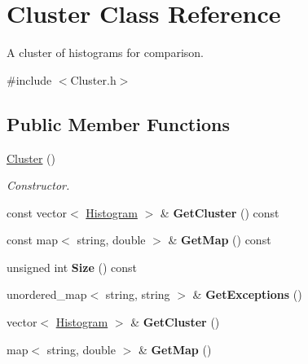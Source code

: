 \hypertarget{classCluster}{}\section{Cluster Class Reference}
\label{classCluster}


A cluster of histograms for comparison.  




{\ttfamily \#include $<$Cluster.\+h$>$}

\subsection*{Public Member Functions}
\begin{DoxyCompactItemize}
\item 
\mbox{\label{classCluster_aee7feb1d599d4c8fda6c3ee83e86ba81}} 
\hyperlink{classCluster_aee7feb1d599d4c8fda6c3ee83e86ba81}{Cluster} ()
\begin{DoxyCompactList}\small\item\em Constructor. \end{DoxyCompactList}\item 
\mbox{\label{classCluster_aa890420aa5906859751f7920dc5b30d0}} 
const vector$<$ \hyperlink{classHistogram}{Histogram} $>$ \& {\bfseries Get\+Cluster} () const
\item 
\mbox{\label{classCluster_a4e3685824bdd4b01763f8e811000f275}} 
const map$<$ string, double $>$ \& {\bfseries Get\+Map} () const
\item 
\mbox{\label{classCluster_a916e731be9d3e52a404152e94b8b127d}} 
unsigned int {\bfseries Size} () const
\item 
\mbox{\label{classCluster_ae703b09c81c25ab89bde18ca09aa1a5d}} 
unordered\+\_\+map$<$ string, string $>$ \& {\bfseries Get\+Exceptions} ()
\item 
\mbox{\label{classCluster_a9c667ad971afdc00ffd2cb83611dabde}} 
vector$<$ \hyperlink{classHistogram}{Histogram} $>$ \& {\bfseries Get\+Cluster} ()
\item 
\mbox{\label{classCluster_a7c98f2cdd78a833e9033f8a9a5a5a7b0}} 
map$<$ string, double $>$ \& {\bfseries Get\+Map} ()

\end{DoxyCompactItemize}
